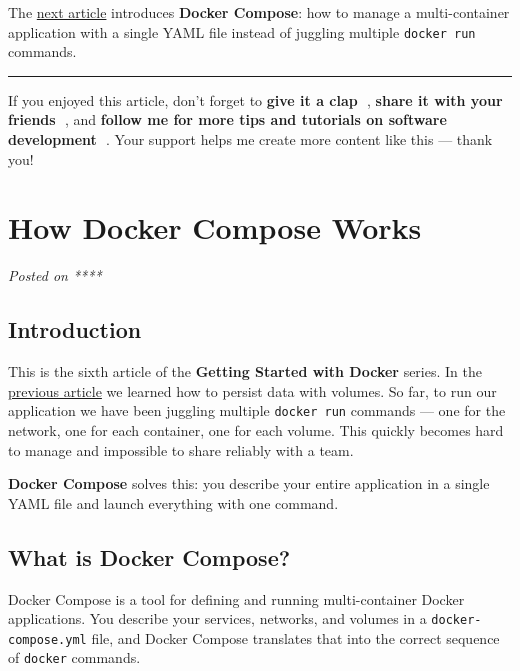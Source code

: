 \documentclass[11pt,american,a4paper,openany]{book}
\begin{document}
The
\href{/Users/sasadangelo/github.com/sasadangelo/code4projects/how-docker-compose-works-2025/}{next
article} introduces \textbf{Docker Compose}: how to manage a
multi-container application with a single YAML file instead of juggling
multiple \texttt{docker\ run} commands.

\begin{center}\rule{0.5\linewidth}{0.5pt}\end{center}

If you enjoyed this article, don't forget to \textbf{give it a clap 👏},
\textbf{share it with your friends 🔗}, and \textbf{follow me for more
tips and tutorials on software development 📘}. Your support helps me
create more content like this --- thank you! 🙌

\section{How Docker Compose Works}\label{how-docker-compose-works}

\emph{Posted on ****}

\subsection{Introduction}\label{introduction-5}

This is the sixth article of the \textbf{Getting Started with Docker}
series. In the
\href{/Users/sasadangelo/github.com/sasadangelo/code4projects/how-docker-volumes-work/}{previous
article} we learned how to persist data with volumes. So far, to run our
application we have been juggling multiple \texttt{docker\ run} commands
--- one for the network, one for each container, one for each volume.
This quickly becomes hard to manage and impossible to share reliably
with a team.

\textbf{Docker Compose} solves this: you describe your entire
application in a single YAML file and launch everything with one
command.

\subsection{What is Docker Compose?}\label{what-is-docker-compose}

Docker Compose is a tool for defining and running multi-container Docker
applications. You describe your services, networks, and volumes in a
\texttt{docker-compose.yml} file, and Docker Compose translates that
into the correct sequence of \texttt{docker} commands.
\end{document}
